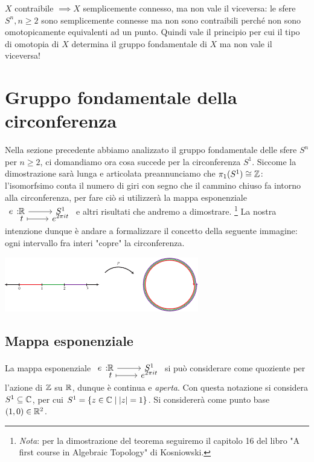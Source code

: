 \begin{attention}
	$X$ contraibile $\implies X$ semplicemente connesso, ma non vale il viceversa: le sfere $S^n, n\geq 2$ sono semplicemente connesse ma non sono contraibili perché non sono omotopicamente equivalenti ad un punto.\newline
	Quindi vale il principio per cui il tipo di omotopia di $X$ determina il gruppo fondamentale di $X$ ma non vale il viceversa!
\end{attention}

		\section{Gruppo fondamentale della circonferenza}
Nella sezione precedente abbiamo analizzato il gruppo fondamentale delle sfere $S^n$ per $n\geq 2$, ci domandiamo ora cosa succede per la circonferenza $S^1$. Siccome la dimostrazione sarà lunga e articolata preannunciamo che $\pi_1(S^1)\cong \mathbb{Z}$: l'isomorfsimo conta il numero di giri con segno che il cammino chiuso fa intorno alla circonferenza, per fare ciò si utilizzerà la mappa esponenziale  $\funztot e \realset {S^1} t {e^{2\pi i t}}$ e altri risultati che andremo a dimostrare. \footnote{\textit{Nota}: per la dimostrazione del teorema seguiremo il capitolo 16 del libro "A first course in Algebraic Topology" di Kosniowski.} \newline
La nostra intenzione dunque è andare a formalizzare il concetto della seguente immagine: ogni intervallo fra interi "copre" la circonferenza.
\begin{center}
	\includegraphics[width=240pt]{images/slinky-eps-converted-to.pdf}
\end{center}

	\subsection{Mappa esponenziale}
La mappa esponenziale $\funztot e \realset {S^1} t {e^{2\pi i t}}$ si può considerare come quoziente per l'azione di $\mathbb{Z}$ su $\mathbb{R}$, dunque è continua e \textit{aperta}. Con questa notazione si considera $S^1\subseteq\mathbb{C}$, per cui $S^1=\{z\in\mathbb{C} \mid |z|=1 \}$. Si considererà come punto base $(1,0) \in \mathbb{R}^2$.

